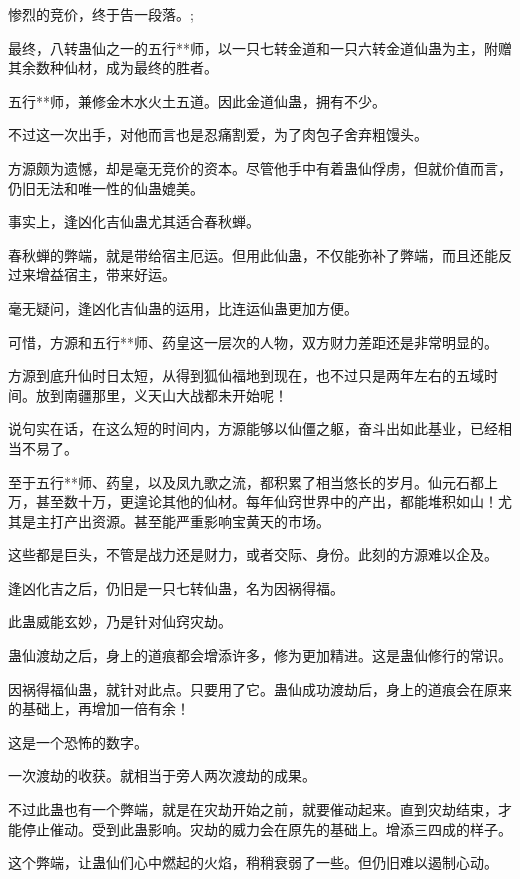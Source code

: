 
\begin{this_body}

惨烈的竞价，终于告一段落。;

最终，八转蛊仙之一的五行**师，以一只七转金道和一只六转金道仙蛊为主，附赠其余数种仙材，成为最终的胜者。

五行**师，兼修金木水火土五道。因此金道仙蛊，拥有不少。

不过这一次出手，对他而言也是忍痛割爱，为了肉包子舍弃粗馒头。

方源颇为遗憾，却是毫无竞价的资本。尽管他手中有着蛊仙俘虏，但就价值而言，仍旧无法和唯一性的仙蛊媲美。

事实上，逢凶化吉仙蛊尤其适合春秋蝉。

春秋蝉的弊端，就是带给宿主厄运。但用此仙蛊，不仅能弥补了弊端，而且还能反过来增益宿主，带来好运。

毫无疑问，逢凶化吉仙蛊的运用，比连运仙蛊更加方便。

可惜，方源和五行**师、药皇这一层次的人物，双方财力差距还是非常明显的。

方源到底升仙时日太短，从得到狐仙福地到现在，也不过只是两年左右的五域时间。放到南疆那里，义天山大战都未开始呢！

说句实在话，在这么短的时间内，方源能够以仙僵之躯，奋斗出如此基业，已经相当不易了。

至于五行**师、药皇，以及凤九歌之流，都积累了相当悠长的岁月。仙元石都上万，甚至数十万，更遑论其他的仙材。每年仙窍世界中的产出，都能堆积如山！尤其是主打产出资源。甚至能严重影响宝黄天的市场。

这些都是巨头，不管是战力还是财力，或者交际、身份。此刻的方源难以企及。

逢凶化吉之后，仍旧是一只七转仙蛊，名为因祸得福。

此蛊威能玄妙，乃是针对仙窍灾劫。

蛊仙渡劫之后，身上的道痕都会增添许多，修为更加精进。这是蛊仙修行的常识。

因祸得福仙蛊，就针对此点。只要用了它。蛊仙成功渡劫后，身上的道痕会在原来的基础上，再增加一倍有余！

这是一个恐怖的数字。

一次渡劫的收获。就相当于旁人两次渡劫的成果。

不过此蛊也有一个弊端，就是在灾劫开始之前，就要催动起来。直到灾劫结束，才能停止催动。受到此蛊影响。灾劫的威力会在原先的基础上。增添三四成的样子。

这个弊端，让蛊仙们心中燃起的火焰，稍稍衰弱了一些。但仍旧难以遏制心动。


\end{this_body}
